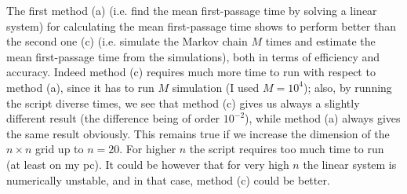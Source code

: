 \documentclass[a4paper,11pt]{article}
\theoremstyle{definition}
\theoremstyle{plain}
\theoremstyle{remark}
\begin{document}
The first method (a) (i.e. find the mean first-passage time by solving a linear system) for calculating the mean first-passage time shows to perform better than the second one (c) (i.e. simulate the Markov chain $M$ times and estimate the mean first-passage time from the simulations), both in terms of efficiency and accuracy. Indeed method (c) requires much more time to run with respect to method (a), since it has to run $M$ simulation (I used $M=10^4$); also, by running the script diverse times, we see that method (c) gives us always a slightly different result (the difference being of order $10^{-2}$), while method (a) always gives the same result obviously. This remains true if we increase the dimension of the $n\times n$ grid up to $n=20$. For higher $n$ the script requires too much time to run (at least on my pc). It could be however that for very high $n$ the linear system is numerically unstable, and in that case, method (c) could be better. 
\end{document}

